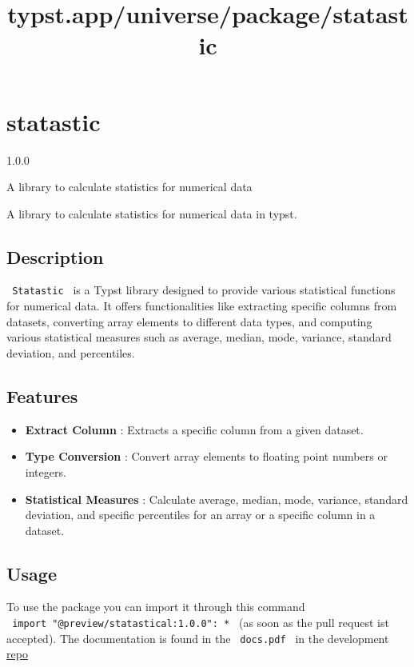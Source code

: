 \title{typst.app/universe/package/statastic}

\label{banner}
\section{statastic}\label{statastic}

{ 1.0.0 }

A library to calculate statistics for numerical data

\label{readme}
A library to calculate statistics for numerical data in typst.

\subsection{Description}\label{description}

\texttt{\ Statastic\ } is a Typst library designed to provide various
statistical functions for numerical data. It offers functionalities like
extracting specific columns from datasets, converting array elements to
different data types, and computing various statistical measures such as
average, median, mode, variance, standard deviation, and percentiles.

\subsection{Features}\label{features}

\begin{itemize}
\tightlist
\item
  \textbf{Extract Column} : Extracts a specific column from a given
  dataset.
\item
  \textbf{Type Conversion} : Convert array elements to floating point
  numbers or integers.
\item
  \textbf{Statistical Measures} : Calculate average, median, mode,
  variance, standard deviation, and specific percentiles for an array or
  a specific column in a dataset.
\end{itemize}

\subsection{Usage}\label{usage}

To use the package you can import it through this command
\texttt{\ import\ "@preview/statastical:1.0.0":\ *\ } (as soon as the
pull request ist accepted). The documentation is found in the
\texttt{\ docs.pdf\ } in the development
\href{https://github.com/dikkadev/typst-statastic}{repo}

